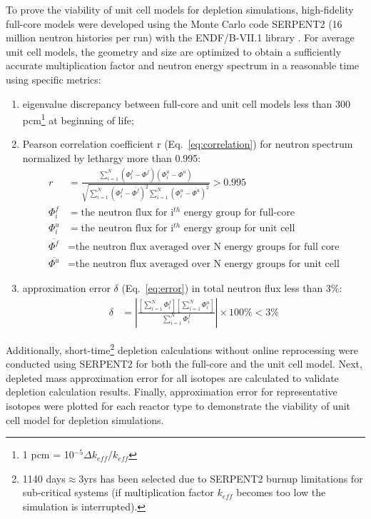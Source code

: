 \documentclass[letterpaper]{mandc2019}
\begin{document}
To prove the viability of unit cell models for depletion simulations, high-fidelity full-core models were developed using the Monte Carlo code SERPENT2 (16 million neutron histories per run) with the ENDF/B-VII.1 library \cite{leppanen_serpent_2015, chadwick_endf/b-vii.1_2011}. For average unit cell models, the geometry and size are optimized to obtain a sufficiently accurate multiplication factor and neutron energy spectrum in a reasonable time using specific metrics:
\vspace{-0.1in}
\begin{enumerate}
	\item eigenvalue discrepancy between full-core and unit cell models less than 300 pcm\footnote{ 1 pcm = 10$^{-5}\Delta k_{eff}/k_{eff}$} at beginning of life;\vspace{-0.11in}
	\item Pearson correlation coefficient r (Eq.~\ref{eq:correlation}) for neutron spectrum normalized by lethargy more than 0.995:
\begin{align}
r &= \frac{\sum_{i=1}^{N} (\Phi_i^f-\overline{\Phi^f})(\Phi_i^u-\overline{\Phi^u})}
		  {\sqrt{\sum_{i=1}^{N} (\Phi_i^f-\overline{\Phi^f})^2 \sum_{i=1}^{N} (\Phi_i^u-\overline{\Phi^u})^2}} > 0.995 \label{eq:correlation} \\
\Phi_i^f &= \mbox{the neutron flux for i$^{th}$ energy group for full-core} \nonumber\\
\Phi_i^u &= \mbox{the neutron flux for i$^{th}$ energy group for unit cell} \nonumber\\
\overline{\Phi^f} &= \mbox{the neutron flux averaged over N energy groups for full core} \nonumber \\
\overline{\Phi^u} &= \mbox{the neutron flux averaged over N energy groups for unit cell} \nonumber
\end{align}		\vspace{-0.3in}
	\item approximation error $\delta$ (Eq.~\ref{eq:error})  in total neutron flux less than 3\%:
\begin{align}
\delta &= | \frac{[\sum_{i=1}^{N} \Phi_i^f] [\sum_{i=1}^{N} \Phi_i^u]}
{\sum_{i=1}^{N} \Phi_i^f} | \times 100\% < 3\% \label{eq:error}
\end{align}	
	\vspace{-0.4in}
\end{enumerate}

Additionally, short-time\footnote{1140 days$\approx$3yrs has been selected due to SERPENT2 burnup limitations for sub-critical systems (if multiplication factor $k_{eff}$ becomes too low the simulation is interrupted).} depletion calculations without online reprocessing were conducted using SERPENT2 for both the full-core and the unit cell model. Next, depleted mass approximation error for all isotopes are calculated to validate depletion calculation results. Finally, approximation error for representative isotopes were plotted for each reactor type to demonstrate the viability of unit cell model for depletion simulations.
\end{document}
